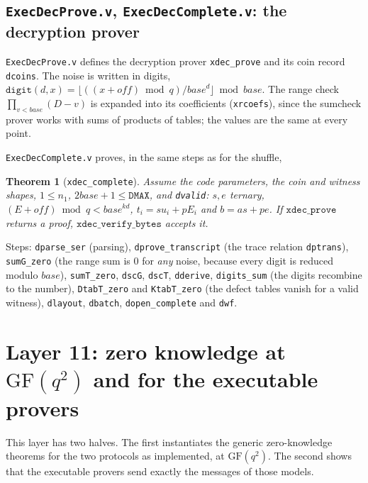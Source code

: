 \documentclass[11pt,a4paper]{article}
\theoremstyle{definition}
\theoremstyle{plain}
\newtheorem{theorem}[definition]{Theorem}
\begin{document}
\subsection{\texttt{ExecDecProve.v}, \texttt{ExecDecComplete.v}: the decryption prover}

\texttt{ExecDecProve.v} defines the decryption prover \texttt{xdec\_prove} and its coin record
\texttt{dcoins}. The noise is written in digits,
$\mathtt{digit}(d,x)=\lfloor((x+\mathit{off})\bmod q)/\mathit{base}^d\rfloor\bmod\mathit{base}$. The range
check $\prod_{v<\mathit{base}}(D-v)$ is expanded into its coefficients (\texttt{xrcoefs}), since the
sumcheck prover works with sums of products of tables; the values are the same at every point.

\texttt{ExecDecComplete.v} proves, in the same steps as for the shuffle,
\begin{theorem}[\texttt{xdec\_complete}]
Assume the code parameters, the coin and witness shapes, $1\le n_1$, $2\mathit{base}+1\le\mathtt{DMAX}$,
and \texttt{dvalid}: $s,e$ ternary, $(E+\mathit{off})\bmod q<\mathit{base}^{kd}$, $t_i=su_i+pE_i$ and
$b=as+pe$. If $\mathtt{xdec\_prove}$ returns a proof, $\mathtt{xdec\_verify\_bytes}$ accepts it.
\end{theorem}
Steps: \texttt{dparse\_ser} (parsing), \texttt{dprove\_transcript} (the trace relation \texttt{dptrans}),
\texttt{sumG\_zero} (the range sum is $0$ for \emph{any} noise, because every digit is reduced modulo
$\mathit{base}$), \texttt{sumT\_zero}, \texttt{dscG}, \texttt{dscT}, \texttt{dderive}, \texttt{digits\_sum}
(the digits recombine to the number), \texttt{DtabT\_zero} and \texttt{KtabT\_zero} (the defect tables
vanish for a valid witness), \texttt{dlayout}, \texttt{dbatch}, \texttt{dopen\_complete} and \texttt{dwf}.

\section{Layer 11: zero knowledge at $\mathrm{GF}(q^2)$ and for the executable provers}
\label{sec:fm-zkexec}

This layer has two halves. The first instantiates the generic zero-knowledge theorems for the two
protocols as implemented, at $\mathrm{GF}(q^2)$. The second shows that the executable provers send
exactly the messages of those models.
\end{document}
